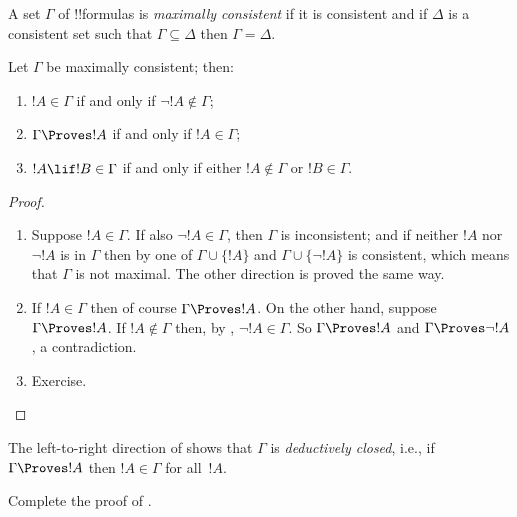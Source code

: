 \documentclass[../../../include/open-logic-section]{subfiles}
\begin{document}


\begin{defn}
A set $\Gamma$ of !!{formula}s is \emph{maximally consistent} if it is
consistent and if $\Delta$ is a consistent set such that $\Gamma
\subseteq \Delta$ then $\Gamma = \Delta$.
\end{defn}

\begin{lem}
Let $\Gamma$ be maximally consistent; then:
\begin{enumerate}
\item {} $!A \in \Gamma$ if and only if $\lnot !A
  \notin \Gamma$;
\item {} $\Gamma \Proves !A$ if and only if $!A \in \Gamma$; 
\item {} $!A \lif !B \in \Gamma$ if and only if
  either $!A \notin \Gamma$ or $!B \in \Gamma$.
\end{enumerate}
\end{lem}

\begin{proof}
\begin{enumerate}
\item Suppose $!A \in \Gamma$. If also $\lnot !A \in \Gamma$, then
  $\Gamma$ is inconsistent; and if neither $!A$ nor $\lnot!A$ is in
  $\Gamma$ then by  one of $\Gamma\cup\{!A\}$ and
  $\Gamma \cup \{\lnot !A\}$ is consistent, which means that $\Gamma$
  is not maximal. The other direction is proved the same way.
\item If $!A \in \Gamma$ then of course $\Gamma \Proves !A$.  On the
  other hand, suppose $\Gamma \Proves !A$. If $!A \notin \Gamma$ then,
  by , $\lnot !A \in \Gamma$.  So $\Gamma \Proves
  !A$ and $\Gamma \Proves \lnot !A$, a contradiction.
\item Exercise.
\end{enumerate}
\end{proof}

The left-to-right direction of  shows that
$\Gamma$ is \emph{deductively closed}, i.e., if $\Gamma \Proves !A$ then $!A
\in \Gamma$ for all~$!A$.

\begin{prob}
  Complete the proof of .
\end{prob}
\end{document}
